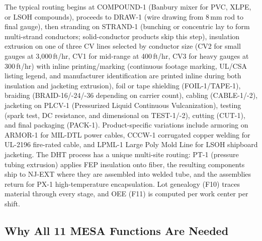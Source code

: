 \documentclass[11pt]{article}
\begin{document}
The typical routing begins at COMPOUND-1 (Banbury mixer for PVC, XLPE, or LSOH compounds), proceeds to DRAW-1 (wire drawing from 8\,mm rod to final gauge), then stranding on STRAND-1 (bunching or concentric lay to form multi-strand conductors; solid-conductor products skip this step), insulation extrusion on one of three CV lines selected by conductor size (CV2 for small gauges at 3{,}000\,ft/hr, CV1 for mid-range at 400\,ft/hr, CV3 for heavy gauges at 300\,ft/hr) with inline printing/marking (continuous footage marking, UL/CSA listing legend, and manufacturer identification are printed inline during both insulation and jacketing extrusion), foil or tape shielding (FOIL-1/TAPE-1), braiding (BRAID-16/-24/-36 depending on carrier count), cabling (CABLE-1/-2), jacketing on PLCV-1 (Pressurized Liquid Continuous Vulcanization), testing (spark test, DC resistance, and dimensional on TEST-1/-2), cutting (CUT-1), and final packaging (PACK-1).  Product-specific variations include armoring on ARMOR-1 for MIL-DTL power cables, CCCW-1 corrugated copper welding for UL-2196 fire-rated cable, and LPML-1 Large Poly Mold Line for LSOH shipboard jacketing.  The DHT process has a unique multi-site routing: PT-1 (pressure tubing extrusion) applies FEP insulation onto fiber, the resulting components ship to NJ-EXT where they are assembled into welded tube, and the assemblies return for PX-1 high-temperature encapsulation.  Lot genealogy (F10) traces material through every stage, and OEE (F11) is computed per work center per shift.


\subsection{Why All 11 MESA Functions Are Needed}
\end{document}
